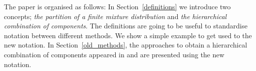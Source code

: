 \documentclass[10pt, a4paper]{article}
\newtheorem{prob}{Problem}
\begin{document}
The paper is organised as follows: In Section~\ref{definitions} we introduce two concepts; \emph{the partition of a finite mixture distribution} and \emph{the hierarchical combination of components}. The definitions are going to be useful to standardise notation between different methods. We show a simple example to get used to the new notation. In Section~\ref{old_methods}, the approaches to obtain a hierarchical combination of components appeared in \cite{hennig2010methods} and \cite{baudry2010combining} are presented using the new notation. 








% 
%
\end{document}
